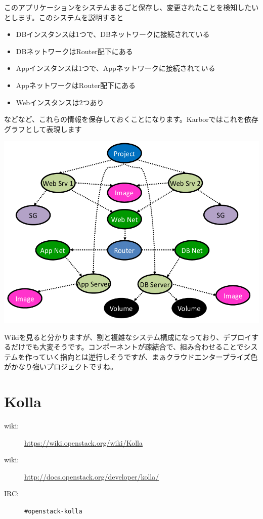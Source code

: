 このアプリケーションをシステムまるごと保存し、変更されたことを検知したいとします。このシステムを説明すると

\begin{itemize}
	\item DBインスタンスは1つで、DBネットワークに接続されている
	\item DBネットワークはRouter配下にある
	\item Appインスタンスは1つで、Appネットワークに接続されている
	\item AppネットワークはRouter配下にある
	\item Webインスタンスは2つあり
\end{itemize}

などなど、これらの情報を保存しておくことになります。Karborではこれを依存グラフとして表現します

\includegraphics[width=\textwidth]{img/Smaug-dependency-graph.png}

Wikiを見ると分かりますが、割と複雑なシステム構成になっており、デプロイするだけでも大変そうです。コンポーネントが疎結合で、組み合わせることでシステムを作っていく指向とは逆行しそうですが、まぁクラウドエンタープライズ色がかなり強いプロジェクトですね。

\section{Kolla}

\begin{description}
	\item[wiki:] \url{https://wiki.openstack.org/wiki/Kolla}
	\item[wiki:] \url{http://docs.openstack.org/developer/kolla/}
	\item[IRC:] \verb|#openstack-kolla|
\end{description}


